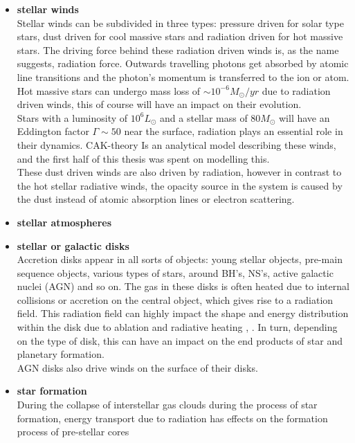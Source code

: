 \begin{itemize}
\item \textbf{stellar winds}\\
Stellar winds can be subdivided in three types: pressure driven for solar type stars, dust driven for cool massive stars and radiation driven for hot massive stars. The driving force behind these radiation driven winds is, as the name suggests, radiation force. Outwards travelling photons get absorbed by atomic line transitions and the photon's momentum is transferred to the ion or atom. Hot massive stars can undergo mass loss of $\sim 10^{-6} M_\odot/yr$ due to radiation driven winds, this of course will have an impact on their evolution. \\
Stars with a luminosity of $10^6 L_\odot$ and a stellar mass of $80 M_\odot$ will have an Eddington factor $\Gamma \sim 50$ near the surface, radiation plays an essential role in their dynamics.
CAK-theory Is an analytical model describing these winds, and the first half of this thesis was spent on modelling this.\\
These dust driven winds are also driven by radiation, however in contrast to the hot stellar radiative winds, the opacity source in the system is caused by the dust instead of atomic absorption lines or electron scattering.

\item \textbf{stellar atmospheres}\\

\item \textbf{stellar or galactic disks}\\
Accretion disks appear in all sorts of objects: young stellar objects, pre-main sequence objects, various types of stars, around BH's, NS's, active galactic nuclei (AGN) \cite{Proga2009} and so on. The gas in these disks is often heated due to internal collisions or accretion on the central object, which gives rise to a radiation field. This radiation field can highly impact the shape and energy distribution within the disk due to ablation and radiative heating \cite{Kee2018}, \cite{Nakatani2017}. In turn, depending on the type of disk, this can have an impact on the end products of star and planetary formation. \\
AGN disks also drive winds on the surface of their disks.

\item \textbf{star formation}\\
During the collapse of interstellar gas clouds during the process of star formation, energy transport due to radiation has effects on the formation process of pre-stellar cores \cite{Bhandare2017}


\end{itemize}
